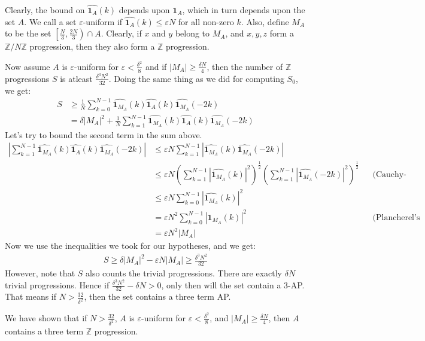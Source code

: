\documentclass{article}
\theoremstyle{definition}
\newcommand{\integer}{\mathbb{Z}}
\newcommand{\znz}{\mathbb{Z}/N\mathbb{Z}}
\newcommand{\indi}{\mathbf{1}_A}
\newcommand{\indim}{\mathbf{1}_{M_A}}
\newcommand{\vep}{\varepsilon}
\begin{document}
Clearly, the bound on $\widehat{\indi}(k)$ depends upon $\indi$, which in turn depends upon the set $A$. We call a set $\vep$-uniform if $\widehat{\indi}(k) \leq \vep N$ for all non-zero $k$. Also, define $M_A$ to be the set $\left[\frac{N}{3}, \frac{2N}{3}\right) \cap A$. Clearly, if $x$ and $y$ belong to $M_A$, and $x,y,z$ form a $\znz$ progression, then they also form a $\integer$ progression.

Now assume $A$ is $\vep$-uniform for $\vep < \frac{\delta^2}{8}$ and if $|M_A| \geq \frac{\delta N}{4}$, then the number of $\integer$ progressions $S$ is atleast $\frac{\delta^3 N^2}{32}$. Doing the same thing as we did for computing $S_0$, we get:
\begin{align*}
    S &\geq \frac{1}{N} \sum_{k=0}^{N-1} \widehat{\indim}(k)\widehat{\indi}(k)\widehat{\indim}(-2k) \\
    &= \delta |M_A|^2 + \frac{1}{N} \sum_{k=1}^{N-1} \widehat{\indim}(k)\widehat{\indi}(k)\widehat{\indim}(-2k)
\end{align*}
Let's try to bound the second term in the sum above.
\begin{align*}
    \left| \sum_{k=1}^{N-1} \widehat{\indim}(k)\widehat{\indi}(k)\widehat{\indim}(-2k) \right| &\leq \vep N \sum_{k=1}^{N-1} \left|\widehat{\indim}(k)\widehat{\indim}(-2k)\right| \\
    &\leq \vep N \left( \sum_{k=1}^{N-1} \left| \widehat{\indim}(k) \right|^2 \right)^{\frac{1}{2}} \left( \sum_{k=1}^{N-1} \left| \widehat{\indim}(-2k) \right|^2 \right)^{\frac{1}{2}} &&\text{(Cauchy-Schwarz inequality)} \\
    &\leq \vep N \sum_{k=0}^{N-1} \left| \widehat{\indim}(k) \right|^2 \\
    &= \vep N^2 \sum_{k=0}^{N-1} |\indim(k)|^2 &&\text{(Plancherel's equality)} \\
    &= \vep N^2 |M_A|
\end{align*}
Now we use the inequalities we took for our hypotheses, and we get:
\begin{align*}
    S \geq \delta|M_A|^2 - \vep N|M_A| \geq \frac{\delta^3 N^2}{32}
\end{align*}
However, note that $S$ also counts the trivial progressions. There are exactly $\delta N$ trivial progressions. Hence if $\frac{\delta^3 N^2}{32} - \delta N > 0$, only then will the set contain a 3-AP. That means if $N > \frac{32}{\delta^2}$, then the set contains a three term AP.

We have shown that if $N > \frac{32}{\delta^2}$, $A$ is $\vep$-uniform for $\vep < \frac{\delta^2}{8}$, and $|M_A| \geq \frac{\delta N}{4}$, then $A$ contains a three term $\integer$ progression.
\end{document}
